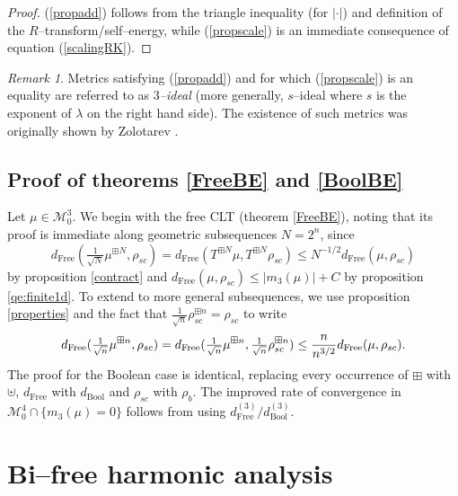 \documentclass{amsart}
\theoremstyle{definition}
\theoremstyle{remark}
\newtheorem{remark}[theorem]{Remark}
\numberwithin{equation}{section}
\begin{document}
\begin{proof}
    (\ref{propadd}) follows from the triangle inequality (for $|\cdot |$) and definition of the $R$--transform/self--energy, while (\ref{propscale}) is an immediate consequence of equation (\ref{scalingRK}).
\end{proof}
\begin{remark}
    Metrics satisfying (\ref{propadd}) and for which (\ref{propscale}) is an equality are referred to as \textit{$3$--ideal} (more generally, $s$--ideal where $s$ is the exponent of $\lambda$ on the right hand side). The existence of such metrics was originally shown by Zolotarev \cite{zolotarev1,zolotarev}. 
\end{remark}

\subsection{Proof of theorems \ref{FreeBE} and \ref{BoolBE}} \label{proof1d}
   Let $\mu\in\mathcal{M}_0^3$. We begin with the free CLT (theorem \ref{FreeBE}), noting that its proof is immediate along geometric subsequences $N=2^n$, since
   \[
        d_{\text{Free}}(\tfrac{1}{\sqrt{N}}\mu^{\boxplus N}, \rho_{sc})=d_{\text{Free}}(T^{\boxplus N}\mu, T^{\boxplus N} \rho_{sc}) \leq N^{-1/2} d_{\text{Free}}(\mu,\rho_{sc})
   \]
   by proposition \ref{contract} and $d_{\text{Free}}(\mu,\rho_{sc})\leq |m_3(\mu)|+C$ by proposition \ref{qe:finite1d}.  To extend to more general subsequences, we use proposition \ref{properties} and the fact that $\frac{1}{\sqrt{n}}\rho_{sc}^{\boxplus n}=\rho_{sc}$ to write
\[
    d_{\text{\normalfont Free}}(\tfrac{1}{\sqrt{n}}\mu^{\boxplus n}, \rho_{sc}) = d_{\text{\normalfont Free}}(\tfrac{1}{\sqrt{n}}\mu^{\boxplus n}, \tfrac{1}{\sqrt{n}}\rho_{sc}^{\boxplus n})\leq \frac{n}{n^{3/2}}{d_{\text{\normalfont Free}}(\mu, \rho_{sc})}.\]
The proof for the Boolean case is identical, replacing every occurrence of $\boxplus$ with $\uplus$, $d_{\text{Free}}$ with $d_{\text{Bool}}$ and $\rho_{sc}$ with $\rho_b$. The improved rate of convergence in $\mathcal{M}_0^4\cap \{m_3(\mu)=0\}$ follows from using $d^{(3)}_{\text{Free}}/d_{\text{Bool}}^{(3)}$.

\section{Bi--free harmonic analysis}\label{bisection}
\end{document}
